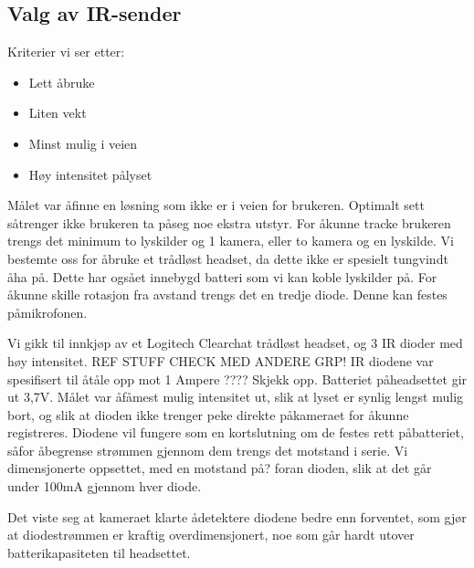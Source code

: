 	\subsection{Valg av IR-sender}
		
		Kriterier vi ser etter:
	
		\begin{itemize}
			\item Lett \aa \space bruke
			\item Liten vekt
			\item Minst mulig i veien
			\item H\o y intensitet p\aa lyset
		\end{itemize}

		M\aa let var \aa \space finne en l\o sning som ikke er i veien for brukeren. Optimalt sett s\aa \space trenger ikke brukeren ta p\aa \space seg noe ekstra utstyr. For \aa \space kunne tracke brukeren trengs det minimum to lyskilder og 1 kamera, eller to kamera og en lyskilde. Vi bestemte oss for \aa \space bruke et tr\aa dl\o st headset, da dette ikke er spesielt tungvindt \aa \space ha p\aa . Dette har ogs\aa \space et innebygd batteri som vi kan koble lyskilder p\aa . For \aa \space kunne skille rotasjon fra avstand trengs det en tredje diode. Denne kan festes p\aa \space mikrofonen.

		Vi gikk til innkj\o p av et Logitech Clearchat tr\aa dl\o st headset, og 3 IR dioder med h\o y intensitet. REF STUFF CHECK MED ANDERE GRP! IR diodene var spesifisert til \aa \space t\aa le opp mot 1 Ampere ???? Skjekk opp. Batteriet p\aa \space headsettet gir ut 3,7V. M\aa let var \aa \space f\aa \space mest mulig intensitet ut, slik at lyset er synlig lengst mulig bort, og slik at dioden ikke trenger peke direkte p\aa \space kameraet for \aa \space kunne registreres. Diodene vil fungere som en kortslutning om de festes rett p\aa \space batteriet, s\aa \space for \aa \space begrense str\o mmen gjennom dem trengs det motstand i serie. Vi dimensjonerte oppsettet, med en motstand p\aa {}? foran dioden, slik at det g\aa r under 100mA gjennom hver diode.

		Det viste seg at kameraet klarte \aa \space detektere diodene bedre enn forventet, som gj\o r at diodestr\o mmen er kraftig overdimensjonert, noe som g\aa r hardt utover batterikapasiteten til headsettet.
